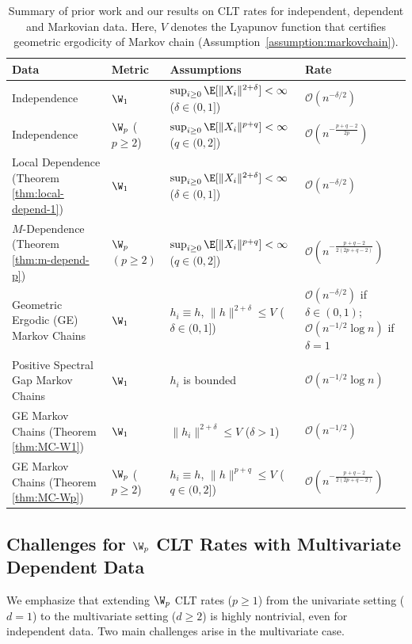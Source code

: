 \documentclass[mnsc,nonblindrev]{informs3}
\begin{document}
\begin{table}[h]
\centering
\begin{tabular}{|p{5.4cm}|p{2cm}|p{4cm}|p{3.9cm}|}
\toprule
Data&Metric& Assumptions& Rate\\
\midrule
\rowcolor{myrow}Independence~\citep{gallouet2018regularity,raivc2018multivariate}&$\W_1$&$\sup_{i \geq 0}\E[\|X_i\|^{2+\delta}]<\infty$ ($\delta \in (0,1]$)&$\mathcal O(n^{-\delta/2})$\\\hline
\rowcolor{myrow}Independence~\citep{bonis2020stein}&$\W_p$ ($p \geq 2$)&$\sup_{i \geq 0}\E[\|X_i\|^{p+q}]<\infty$ ($q \in (0,2]$)&$\mathcal O(n^{-\tfrac{p+q-2}{2p}})$\\\hline
\rowcolor{red!8}Local Dependence (Theorem \ref{thm:local-depend-1})&$\W_1$&$\sup_{i \geq 0}\E[\|X_i\|^{2+\delta}]<\infty$ ($\delta \in (0,1]$)&$\mathcal O ( n^{-\delta/2})$\\\hline
\rowcolor{red!8}$M$-Dependence (Theorem \ref{thm:m-depend-p})&$\W_p$ $ (p \geq 2)$&$\sup_{i \geq 0}\E[\|X_i\|^{p+q}]<\infty$ ($q \in (0,2]$)&$\mathcal O (n^{-\frac{p+q-2}{2(2p+q-2)}})$\\\hline
\rowcolor{yellow!8}Geometric Ergodic (GE) Markov Chains~\citep{srikant2024rates}&$\W_1$&$h_i\equiv h$, $\|h\|^{2+\delta} \leq V$  ($\delta \in (0,1]$)&$
    \mathcal{O}(n^{-\delta/2})$ if $\delta \in (0,1)$; $\mathcal{O}(  n^{-1/2}\log n)$ if $\delta =1$\\\hline
\rowcolor{yellow!8}Positive Spectral Gap Markov Chains~\citep{wu2025uncertainty}&$\W_1$&$h_i$ is bounded&$\mathcal{O}(  n^{-1/2}\log n)$\\\hline
\rowcolor{red!8}GE Markov Chains (Theorem \ref{thm:MC-W1})&$\W_1$&$\|h_i\|^{2+\delta} \leq V$  ($\delta >1$)& $\mathcal{O}(  n^{-1/2})$\\\hline
\rowcolor{red!8}GE Markov Chains (Theorem \ref{thm:MC-Wp})&$\W_p$ ($p \geq 2$)&$h_i\equiv h$, $\|h\|^{p+q} \leq V$  ($q \in (0,2]$)&$\mathcal O (n^{-\frac{p+q-2}{2(2p+q-2)}})$\\
\bottomrule
\end{tabular}
\caption{Summary of prior work and our results on CLT rates for independent, dependent and Markovian data. Here, $V$ denotes the Lyapunov function that certifies geometric ergodicity of Markov chain (Assumption~\ref{assumption:markovchain}).
}
\label{tab:summary}
\end{table}
\subsection{Challenges for $\W_p$ CLT Rates with Multivariate Dependent Data
}\label{sec:challenge}
We emphasize that extending $\W_p$ CLT rates ($p\ge 1$) from the univariate setting ($d=1$)
to the multivariate setting ($d\ge 2$) is highly nontrivial, even for independent data.
Two main challenges arise in the multivariate case.
\end{document}

